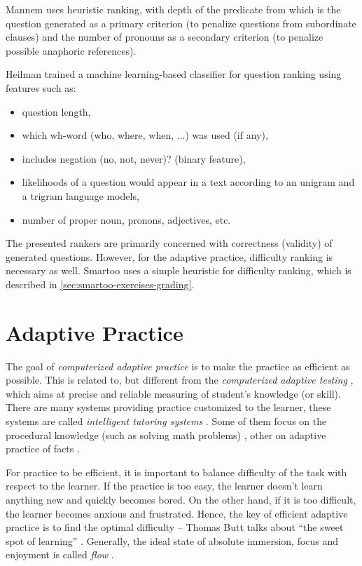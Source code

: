 \documentclass[12pt, twoside]{fithesis2}		%
\renewcommand{\_}{\leavevmode \kern0.07em\vbox{\hrule width0.4em}}
\newcommand{\squarebullet}{\textcolor{black}{\raisebox{0.15em}{\rule{4pt}{4pt}}}}
\newcommand{\emptysquarebullet}{\textcolor{black}{\raisebox{0.10em}{\tiny$\square$}}}
\newenvironment{myItemize}{
  \begin{itemize}[leftmargin=2em,rightmargin=1em,itemsep=\parskip ,parsep=0em,topsep=0em,partopsep=0em]
  \renewcommand{\labelitemi}{\squarebullet}
  \renewcommand{\labelitemii}{\textbullet}
}{
  \end{itemize}
}
\begin{document}
Mannem \cite{question-gen-mannem} uses heuristic ranking,
with depth of the predicate from which is the question generated as a primary criterion
(to penalize questions from subordinate clauses)
and the number of pronouns as a secondary criterion (to penalize possible anaphoric references).

Heilman \cite{question-gen-heilman} trained a machine learning-based classifier for question ranking using features such as:
\begin{myItemize}
\item question length,
\item which wh-word (who, where, when, ...) was used (if any),
\item includes negation (no, not, never)? (binary feature),
\item likelihoods of a question would appear in a text according to an unigram and a trigram language models,
\item number of proper noun, pronons, adjectives, etc.
\end{myItemize}

The presented rankers are primarily concerned with correctness (validity) of generated questions.
However, for the adaptive practice, difficulty ranking is necessary as well.
Smartoo uses a simple heuristic for difficulty ranking, which is described in \autoref{sec:smartoo-exercises-grading}.


\chapter{Adaptive Practice}
\label{chap:practice}

The goal of \emph{computerized adaptive practice} \cite{adaptive-practice-irt-math}
is to make the practice as efficient as possible.
This is related to, but different from the \emph{computerized adaptive testing} \cite{computerized-adaptive-testing},
which aims at precise and reliable measuring of student's knowledge (or skill).
There are many systems providing practice customized to the learner,
these systems are called \emph{intelligent tutoring systems} \cite{tutoring-systems-behavior}.
Some of them focus on the procedural knowledge (such as solving math problems) \cite{adaptive-practice-irt-math},
other on adaptive practice of facts \cite{slepe-mapy}.

For practice to be efficient, it is important to balance difficulty of the task with respect to the learner.
If the practice is too easy, the learner doesn't learn anything new and quickly becomes bored.
On the other hand, if it is too difficult, the learner becomes anxious and frustrated.
Hence, the key of efficient adaptive practice is to find the optimal difficulty --
Thomas Butt talks about ``the sweet spot of learning'' \cite{adaptive-practice}.
Generally, the ideal state of absolute immersion, focus and enjoyment is called \emph{flow} \cite{flow}.
\end{document}
